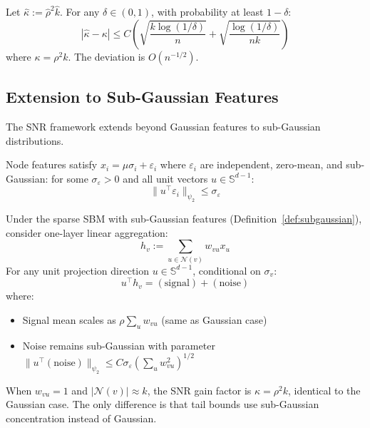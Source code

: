 \begin{corollary}
\label{cor:kappa_concentration}
Let $\hat{\kappa} := \hat{\rho}^2 \hat{k}$. For any $\delta \in (0, 1)$, with probability at least $1 - \delta$:
\begin{equation}
    |\hat{\kappa} - \kappa| \leq C\left(\sqrt{\frac{k \log(1/\delta)}{n}} + \sqrt{\frac{\log(1/\delta)}{nk}}\right)
\end{equation}
where $\kappa = \rho^2 k$. The deviation is $O(n^{-1/2})$.
\end{corollary}

\subsection{Extension to Sub-Gaussian Features}
\label{subsec:subgaussian}

The SNR framework extends beyond Gaussian features to sub-Gaussian distributions.

\begin{definition}
\label{def:subgaussian}
Node features satisfy $x_i = \mu \sigma_i + \varepsilon_i$ where $\varepsilon_i$ are independent, zero-mean, and sub-Gaussian: for some $\sigma_\varepsilon > 0$ and all unit vectors $u \in \mathbb{S}^{d-1}$:
\begin{equation}
    \|u^\top \varepsilon_i\|_{\psi_2} \leq \sigma_\varepsilon
\end{equation}
\end{definition}

\begin{theorem}
\label{thm:subgaussian_snr}
Under the sparse SBM with sub-Gaussian features (Definition~\ref{def:subgaussian}), consider one-layer linear aggregation:
\begin{equation}
    h_v := \sum_{u \in \mathcal{N}(v)} w_{vu} x_u
\end{equation}
For any unit projection direction $u \in \mathbb{S}^{d-1}$, conditional on $\sigma_v$:
\begin{equation}
    u^\top h_v = (\text{signal}) + (\text{noise})
\end{equation}
where:
\begin{itemize}
    \item Signal mean scales as $\rho \sum_{u} w_{vu}$ (same as Gaussian case)
    \item Noise remains sub-Gaussian with parameter $\|u^\top(\text{noise})\|_{\psi_2} \leq C\sigma_\varepsilon (\sum_u w_{vu}^2)^{1/2}$
\end{itemize}
When $w_{vu} = 1$ and $|\mathcal{N}(v)| \approx k$, the SNR gain factor is $\kappa = \rho^2 k$, identical to the Gaussian case. The only difference is that tail bounds use sub-Gaussian concentration instead of Gaussian.
\end{theorem}


